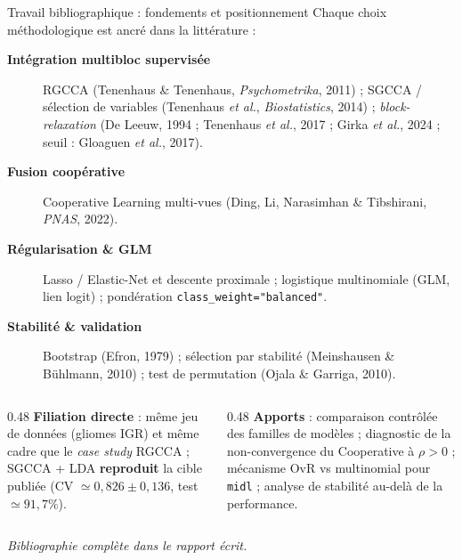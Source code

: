\documentclass[aspectratio=169, 10pt]{beamer}
\begin{document}
\begin{frame}{Travail bibliographique : fondements et positionnement}
  Chaque choix méthodologique est ancré dans la littérature :
  \begin{description}
    \item[\textbf{Intégration multibloc supervisée}] RGCCA (Tenenhaus \& Tenenhaus, \textit{Psychometrika}, 2011) ; SGCCA / sélection de variables (Tenenhaus \textit{et al.}, \textit{Biostatistics}, 2014) ; \textit{block-relaxation} (De Leeuw, 1994 ; Tenenhaus \textit{et al.}, 2017 ; Girka \textit{et al.}, 2024 ; seuil : Gloaguen \textit{et al.}, 2017).
    \item[\textbf{Fusion coopérative}] Cooperative Learning multi-vues (Ding, Li, Narasimhan \& Tibshirani, \textit{PNAS}, 2022).
    \item[\textbf{Régularisation \& GLM}] Lasso / Elastic-Net et descente proximale ; logistique multinomiale (GLM, lien logit) ; pondération \texttt{class\_weight="balanced"}.
    \item[\textbf{Stabilité \& validation}] Bootstrap (Efron, 1979) ; sélection par stabilité (Meinshausen \& Bühlmann, 2010) ; test de permutation (Ojala \& Garriga, 2010).
  \end{description}

  \begin{columns}[T]
    \begin{column}{0.48\textwidth}
      \textbf{Filiation directe} : même jeu de données (gliomes IGR) et même cadre que le \textit{case study} RGCCA ; SGCCA + LDA \textbf{reproduit} la cible publiée (CV $\simeq 0{,}826 \pm 0{,}136$, test $\simeq 91{,}7\%$).
    \end{column}
    \begin{column}{0.48\textwidth}
      \textbf{Apports} : comparaison contrôlée des familles de modèles ; diagnostic de la non-convergence du Cooperative à $\rho > 0$ ; mécanisme OvR vs multinomial pour \texttt{midl} ; analyse de stabilité au-delà de la performance.
    \end{column}
  \end{columns}

  \bigskip
  \textit{Bibliographie complète dans le rapport écrit.}
\end{frame}
\end{document}
